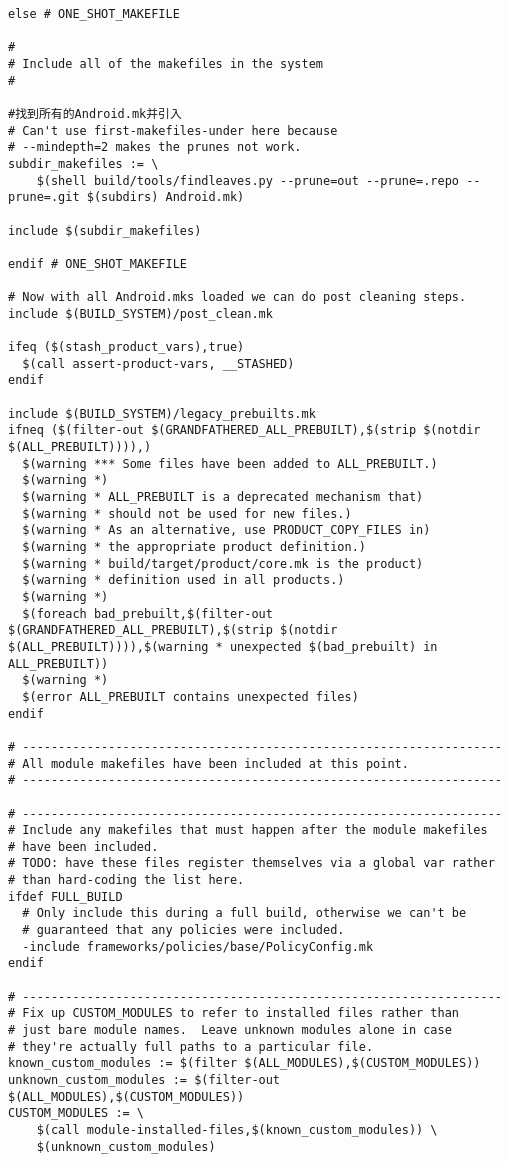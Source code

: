 \documentclass[12pt,a4paper]{article}
\begin{document}
\begin{verbatim}
else # ONE_SHOT_MAKEFILE

#
# Include all of the makefiles in the system
#

#找到所有的Android.mk并引入
# Can't use first-makefiles-under here because
# --mindepth=2 makes the prunes not work.
subdir_makefiles := \
	$(shell build/tools/findleaves.py --prune=out --prune=.repo --prune=.git $(subdirs) Android.mk)

include $(subdir_makefiles)

endif # ONE_SHOT_MAKEFILE

# Now with all Android.mks loaded we can do post cleaning steps.
include $(BUILD_SYSTEM)/post_clean.mk

ifeq ($(stash_product_vars),true)
  $(call assert-product-vars, __STASHED)
endif

include $(BUILD_SYSTEM)/legacy_prebuilts.mk
ifneq ($(filter-out $(GRANDFATHERED_ALL_PREBUILT),$(strip $(notdir $(ALL_PREBUILT)))),)
  $(warning *** Some files have been added to ALL_PREBUILT.)
  $(warning *)
  $(warning * ALL_PREBUILT is a deprecated mechanism that)
  $(warning * should not be used for new files.)
  $(warning * As an alternative, use PRODUCT_COPY_FILES in)
  $(warning * the appropriate product definition.)
  $(warning * build/target/product/core.mk is the product)
  $(warning * definition used in all products.)
  $(warning *)
  $(foreach bad_prebuilt,$(filter-out $(GRANDFATHERED_ALL_PREBUILT),$(strip $(notdir $(ALL_PREBUILT)))),$(warning * unexpected $(bad_prebuilt) in ALL_PREBUILT))
  $(warning *)
  $(error ALL_PREBUILT contains unexpected files)
endif

# -------------------------------------------------------------------
# All module makefiles have been included at this point.
# -------------------------------------------------------------------

# -------------------------------------------------------------------
# Include any makefiles that must happen after the module makefiles
# have been included.
# TODO: have these files register themselves via a global var rather
# than hard-coding the list here.
ifdef FULL_BUILD
  # Only include this during a full build, otherwise we can't be
  # guaranteed that any policies were included.
  -include frameworks/policies/base/PolicyConfig.mk
endif

# -------------------------------------------------------------------
# Fix up CUSTOM_MODULES to refer to installed files rather than
# just bare module names.  Leave unknown modules alone in case
# they're actually full paths to a particular file.
known_custom_modules := $(filter $(ALL_MODULES),$(CUSTOM_MODULES))
unknown_custom_modules := $(filter-out $(ALL_MODULES),$(CUSTOM_MODULES))
CUSTOM_MODULES := \
	$(call module-installed-files,$(known_custom_modules)) \
	$(unknown_custom_modules)


\end{verbatim}
\end{document}
